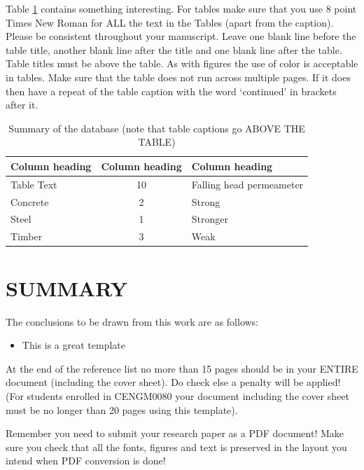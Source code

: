 \documentclass[a4paper,10pt]{article}
\begin{document}
Table \ref{tab_materials} contains something interesting. For tables make sure that you use 8 point Times New Roman for ALL the text in the Tables (apart from the caption). Please be consistent throughout your manuscript. Leave one blank line before the table title, another blank line after the title and one blank line after the table. Table titles must be above the table. As with figures the use of color is acceptable in tables. Make sure that the table does not run across multiple pages. If it does then have a repeat of the table caption with the word ‘continued’ in brackets after it.


\begin{table}[h]
\begin{center}
\caption{Summary of the database (note that table captions go ABOVE THE TABLE)}
\begin{tabular}{ |l|c|l| }
\hline
 \textbf{Column heading} & \textbf{Column heading}    & \textbf{Column heading} \\ \hline 
 Table Text     & 10     & Falling head permeameter \\  \hline 
 Concrete       & 2      & Strong \\ \hline 
 Steel          & 1      & Stronger \\ \hline 
 Timber         & 3      & Weak \\ 
 \hline
\end{tabular}
\label{tab_materials}
\end{center}
\end{table}


\section{SUMMARY}

The conclusions to be drawn from this work are as follows:
\begin{itemize}
    \item 	This is a great template
\end{itemize}


At the end of the reference list no more than 15 pages should be in your ENTIRE document (including the cover sheet). Do check else a penalty will be applied!  (For students enrolled in CENGM0080 your document including the cover sheet must be no longer than 20 pages using this template).

Remember you need to submit your research paper as a PDF document! Make sure you check that all the fonts, figures and text is preserved in the layout you intend when PDF conversion is done!
\end{document}
